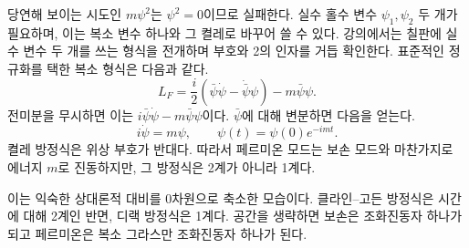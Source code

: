\begin{classroomqa}
\end{classroomqa}

당연해 보이는 시도인 \(m\psi^2\)는 \(\psi^2=0\)이므로 실패한다. 실수 홀수 변수 \(\psi_1,\psi_2\) 두 개가 필요하며, 이는 복소 변수 하나와 그 켤레로 바꾸어 쓸 수 있다. 강의에서는 칠판에 실수 변수 두 개를 쓰는 형식을 전개하며 부호와 2의 인자를 거듭 확인한다. 표준적인 정규화를 택한 복소 형식은 다음과 같다.
\begin{equation}
L_F=\frac{i}{2}
\left(\bar\psi\dot\psi-\dot{\bar\psi}\psi\right)
-m\bar\psi\psi.
\label{eq:l7-fermion-lagrangian}
\end{equation}
전미분을 무시하면 이는 \(i\bar\psi\dot\psi-m\bar\psi\psi\)이다. \(\bar\psi\)에 대해 변분하면 다음을 얻는다.
\begin{equation}
i\dot\psi=m\psi,
\qquad
\psi(t)=\psi(0)e^{-imt}.
\label{eq:l7-fermion-eom}
\end{equation}
켤레 방정식은 위상 부호가 반대다. 따라서 페르미온 모드는 보손 모드와 마찬가지로 에너지 \(m\)로 진동하지만, 그 방정식은 2계가 아니라 1계다.


이는 익숙한 상대론적 대비를 0차원으로 축소한 모습이다. 클라인--고든 방정식은 시간에 대해 2계인 반면, 디랙 방정식은 1계다. 공간을 생략하면 보손은 조화진동자 하나가 되고 페르미온은 복소 그라스만 조화진동자 하나가 된다.

\begin{classroomqa}
\end{classroomqa}

